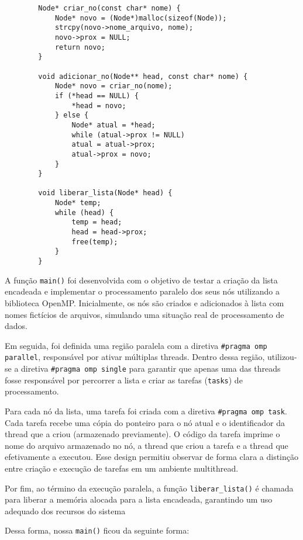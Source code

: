 \documentclass[a4paper, 12pt]{article}
\begin{document}
	\begin{verbatim}
		Node* criar_no(const char* nome) {
		    Node* novo = (Node*)malloc(sizeof(Node));
		    strcpy(novo->nome_arquivo, nome);
		    novo->prox = NULL;
		    return novo;
		}
		
		void adicionar_no(Node** head, const char* nome) {
		    Node* novo = criar_no(nome);
		    if (*head == NULL) {
		        *head = novo;
		    } else {
		        Node* atual = *head;
		        while (atual->prox != NULL)
		        atual = atual->prox;
		        atual->prox = novo;
		    }
		}
		
		void liberar_lista(Node* head) {
		    Node* temp;
		    while (head) {
		        temp = head;
		        head = head->prox;
		        free(temp);
		    }
		}
	\end{verbatim}
	
	A função \texttt{main()} foi desenvolvida com o objetivo de testar a criação da lista encadeada e implementar o processamento paralelo dos seus nós utilizando a biblioteca OpenMP. Inicialmente, os nós são criados e adicionados à lista com nomes fictícios de arquivos, simulando uma situação real de processamento de dados.
	
	Em seguida, foi definida uma região paralela com a diretiva \texttt{\#pragma omp parallel}, responsável por ativar múltiplas threads. Dentro dessa região, utilizou-se a diretiva \texttt{\#pragma omp single} para garantir que apenas uma das threads fosse responsável por percorrer a lista e criar as tarefas (\texttt{tasks}) de processamento.
	
	Para cada nó da lista, uma tarefa foi criada com a diretiva \texttt{\#pragma omp task}. Cada tarefa recebe uma cópia do ponteiro para o nó atual e o identificador da thread que a criou (armazenado previamente). O código da tarefa imprime o nome do arquivo armazenado no nó, a thread que criou a tarefa e a thread que efetivamente a executou. Esse design permitiu observar de forma clara a distinção entre criação e execução de tarefas em um ambiente multithread.
	
	Por fim, ao término da execução paralela, a função \texttt{liberar\_lista()} é chamada para liberar a memória alocada para a lista encadeada, garantindo um uso adequado dos recursos do sistema
	
	Dessa forma, nossa \texttt{main()} ficou da seguinte forma:
	
\end{document}
